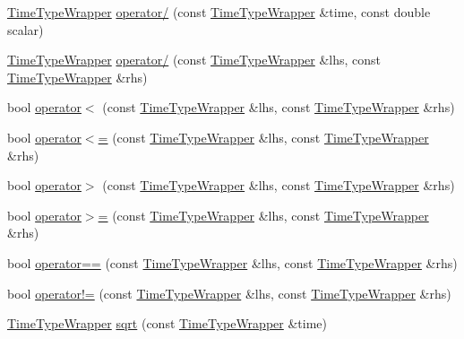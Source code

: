 \begin{DoxyCompactItemize}
\item 
\hyperlink{structvt_1_1_time_type_wrapper}{Time\+Type\+Wrapper} \hyperlink{structvt_1_1_time_type_wrapper_adf78cb5a565bd8defd464de0dadba748}{operator/} (const \hyperlink{structvt_1_1_time_type_wrapper}{Time\+Type\+Wrapper} \&time, const double scalar)
\item 
\hyperlink{structvt_1_1_time_type_wrapper}{Time\+Type\+Wrapper} \hyperlink{structvt_1_1_time_type_wrapper_a6ae72117fbbbd813cb147f18196f9874}{operator/} (const \hyperlink{structvt_1_1_time_type_wrapper}{Time\+Type\+Wrapper} \&lhs, const \hyperlink{structvt_1_1_time_type_wrapper}{Time\+Type\+Wrapper} \&rhs)
\item 
bool \hyperlink{structvt_1_1_time_type_wrapper_adbf090742dcb35298a559f6108e1f373}{operator$<$} (const \hyperlink{structvt_1_1_time_type_wrapper}{Time\+Type\+Wrapper} \&lhs, const \hyperlink{structvt_1_1_time_type_wrapper}{Time\+Type\+Wrapper} \&rhs)
\item 
bool \hyperlink{structvt_1_1_time_type_wrapper_a273632f126348cb63cf02b3d050bf5e8}{operator$<$=} (const \hyperlink{structvt_1_1_time_type_wrapper}{Time\+Type\+Wrapper} \&lhs, const \hyperlink{structvt_1_1_time_type_wrapper}{Time\+Type\+Wrapper} \&rhs)
\item 
bool \hyperlink{structvt_1_1_time_type_wrapper_aa0a3862c4cc029a4c083865b96ca0fcc}{operator$>$} (const \hyperlink{structvt_1_1_time_type_wrapper}{Time\+Type\+Wrapper} \&lhs, const \hyperlink{structvt_1_1_time_type_wrapper}{Time\+Type\+Wrapper} \&rhs)
\item 
bool \hyperlink{structvt_1_1_time_type_wrapper_af28b3f7a4c7802a8eb7f76943712fa15}{operator$>$=} (const \hyperlink{structvt_1_1_time_type_wrapper}{Time\+Type\+Wrapper} \&lhs, const \hyperlink{structvt_1_1_time_type_wrapper}{Time\+Type\+Wrapper} \&rhs)
\item 
bool \hyperlink{structvt_1_1_time_type_wrapper_a83ec275efb1d17d07c5cf560809694ea}{operator==} (const \hyperlink{structvt_1_1_time_type_wrapper}{Time\+Type\+Wrapper} \&lhs, const \hyperlink{structvt_1_1_time_type_wrapper}{Time\+Type\+Wrapper} \&rhs)
\item 
bool \hyperlink{structvt_1_1_time_type_wrapper_af262df7ce230a03a6d8834cda01ffce2}{operator!=} (const \hyperlink{structvt_1_1_time_type_wrapper}{Time\+Type\+Wrapper} \&lhs, const \hyperlink{structvt_1_1_time_type_wrapper}{Time\+Type\+Wrapper} \&rhs)
\item 
\hyperlink{structvt_1_1_time_type_wrapper}{Time\+Type\+Wrapper} \hyperlink{structvt_1_1_time_type_wrapper_af65b2073afd3948afa486affcaedeb11}{sqrt} (const \hyperlink{structvt_1_1_time_type_wrapper}{Time\+Type\+Wrapper} \&time)
\end{DoxyCompactItemize}


